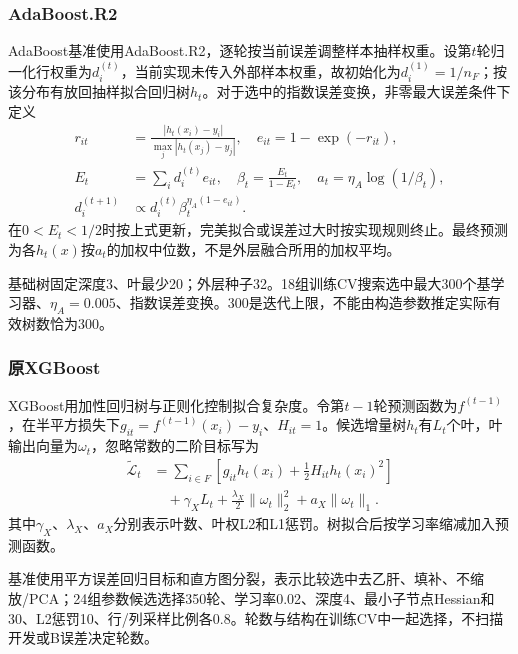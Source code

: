 \subsubsection{AdaBoost.R2}
AdaBoost基准使用AdaBoost.R2，逐轮按当前误差调整样本抽样权重\cite{ada}。设第$t$轮归一化行权重为$d_i^{(t)}$，当前实现未传入外部样本权重，故初始化为$d_i^{(1)}=1/n_F$；按该分布有放回抽样拟合回归树$h_t$。对于选中的指数误差变换，非零最大误差条件下定义
\begin{equation}
\begin{aligned}
r_{it}&=\frac{|h_t(x_i)-y_i|}{\max_j|h_t(x_j)-y_j|},\quad e_{it}=1-\exp(-r_{it}),\\
E_t&=\sum_i d_i^{(t)}e_{it},\quad\beta_t=\frac{E_t}{1-E_t},\quad
a_t=\eta_A\log(1/\beta_t),\\
d_i^{(t+1)}&\propto d_i^{(t)}\beta_t^{\eta_A(1-e_{it})}.
\end{aligned}
\label{eq:ada}
\end{equation}
在$0<E_t<1/2$时按上式更新，完美拟合或误差过大时按实现规则终止。最终预测为各$h_t(x)$按$a_t$的加权中位数，不是外层融合所用的加权平均。

基础树固定深度3、叶最少20；外层种子32。18组训练CV搜索选中最大300个基学习器、$\eta_A=0.005$、指数误差变换。300是迭代上限，不能由构造参数推定实际有效树数恰为300。

\subsubsection{原XGBoost}
XGBoost用加性回归树与正则化控制拟合复杂度\cite{xgboost}。令第$t-1$轮预测函数为$f^{(t-1)}$，在半平方损失下$g_{it}=f^{(t-1)}(x_i)-y_i$、$H_{it}=1$。候选增量树$h_t$有$L_t$个叶，叶输出向量为$\omega_t$，忽略常数的二阶目标写为
\begin{equation}
\begin{aligned}
\widetilde{\mathcal L}_t&=
\sum_{i\in F}\left[g_{it}h_t(x_i)+\frac12 H_{it}h_t(x_i)^2\right]
\\
{}&\quad+\gamma_X L_t+\frac{\lambda_X}{2}\|\omega_t\|_2^2+a_X\|\omega_t\|_1.
\end{aligned}
\label{eq:xgb}
\end{equation}
其中$\gamma_X$、$\lambda_X$、$a_X$分别表示叶数、叶权L2和L1惩罚。树拟合后按学习率缩减加入预测函数。

基准使用平方误差回归目标和直方图分裂，表示比较选中去乙肝、填补、不缩放/PCA；24组参数候选选择350轮、学习率0.02、深度4、最小子节点Hessian和30、L2惩罚10、行/列采样比例各0.8。轮数与结构在训练CV中一起选择，不扫描开发或B误差决定轮数。

